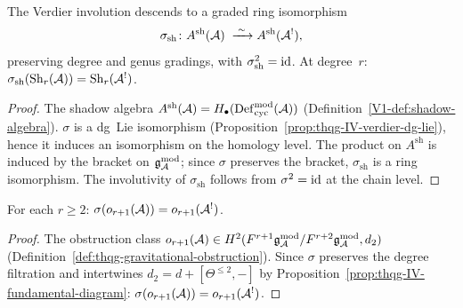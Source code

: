 \begin{proposition}
The Verdier involution descends to a graded ring isomorphism
\begin{equation}%
\sigma_{\mathrm{sh}}\colon
A^{\mathrm{sh}}(\cA)
\;\xrightarrow{\;\sim\;}
A^{\mathrm{sh}}(\cA^!),
\end{equation}
preserving degree and genus gradings, with $\sigma_{\mathrm{sh}}^2 = \mathrm{id}$.
At degree~$r$:
$\sigma_{\mathrm{sh}}(\mathrm{Sh}_r(\mathcal{A})) = \mathrm{Sh}_r(\mathcal{A}^!)$.
\end{proposition}

\begin{proof}
The shadow algebra $A^{\mathrm{sh}}(\mathcal{A}) = H_\bullet(\mathrm{Def}_{\mathrm{cyc}}^{\mathrm{mod}}(\mathcal{A}))$
(Definition~\ref{V1-def:shadow-algebra}).
$\sigma$ is a dg~Lie isomorphism
(Proposition~\ref{prop:thqg-IV-verdier-dg-lie}),
hence it induces an isomorphism on the homology level.
The product on $A^{\mathrm{sh}}$ is induced by the bracket on $\mathfrak{g}_{\mathcal{A}}^{\mathrm{mod}}$;
since $\sigma$ preserves the bracket, $\sigma_{\mathrm{sh}}$ is a ring
isomorphism. The involutivity of $\sigma_{\mathrm{sh}}$ follows from
$\sigma^2 = \mathrm{id}$ at the chain level.
\end{proof}

\begin{corollary}
For each $r \geq 2$:
$\sigma(o_{r+1}(\mathcal{A})) = o_{r+1}(\mathcal{A}^!)$.
\end{corollary}

\begin{proof}
The obstruction class $o_{r+1}(\mathcal{A})
\in H^2(F^{r+1}\mathfrak{g}_{\mathcal{A}}^{\mathrm{mod}}/F^{r+2}\mathfrak{g}_{\mathcal{A}}^{\mathrm{mod}}, d_2)$
(Definition~\ref{def:thqg-gravitational-obstruction}).
Since $\sigma$ preserves the degree filtration and intertwines
$d_2 = d + [\Theta^{\leq 2}, -]$ by Proposition~\ref{prop:thqg-IV-fundamental-diagram}:
$\sigma(o_{r+1}(\mathcal{A})) = o_{r+1}(\mathcal{A}^!)$.
\end{proof}

